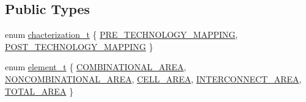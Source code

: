 \subsection*{Public Types}
\begin{DoxyCompactItemize}
\item 
enum \hyperlink{classarea__model_a8bb245f91e2af8874434d985e96a64a2}{chacterization\+\_\+t} \{ \hyperlink{classarea__model_a8bb245f91e2af8874434d985e96a64a2a9e6c444ad927f0509bb963a829231f2c}{P\+R\+E\+\_\+\+T\+E\+C\+H\+N\+O\+L\+O\+G\+Y\+\_\+\+M\+A\+P\+P\+I\+NG}, 
\hyperlink{classarea__model_a8bb245f91e2af8874434d985e96a64a2af80d725dcb73222e795156892d49b646}{P\+O\+S\+T\+\_\+\+T\+E\+C\+H\+N\+O\+L\+O\+G\+Y\+\_\+\+M\+A\+P\+P\+I\+NG}
 \}
\item 
enum \hyperlink{classarea__model_ac1fe30caa84927ad582e392cc6821951}{element\+\_\+t} \{ \newline
\hyperlink{classarea__model_ac1fe30caa84927ad582e392cc6821951ad0ebf06d6b78fbefcb0e5c50d7d0dc99}{C\+O\+M\+B\+I\+N\+A\+T\+I\+O\+N\+A\+L\+\_\+\+A\+R\+EA}, 
\hyperlink{classarea__model_ac1fe30caa84927ad582e392cc6821951af4189fdcd8d0b8f772317c1e40ba8b38}{N\+O\+N\+C\+O\+M\+B\+I\+N\+A\+T\+I\+O\+N\+A\+L\+\_\+\+A\+R\+EA}, 
\hyperlink{classarea__model_ac1fe30caa84927ad582e392cc6821951ace89585784f8d954c82f911699e50a5d}{C\+E\+L\+L\+\_\+\+A\+R\+EA}, 
\hyperlink{classarea__model_ac1fe30caa84927ad582e392cc6821951a6f7f2b63cd258c49d6423f77daee4437}{I\+N\+T\+E\+R\+C\+O\+N\+N\+E\+C\+T\+\_\+\+A\+R\+EA}, 
\newline
\hyperlink{classarea__model_ac1fe30caa84927ad582e392cc6821951a25d20f939a45888e81197ff61eeaeb34}{T\+O\+T\+A\+L\+\_\+\+A\+R\+EA}
 \}
\end{DoxyCompactItemize}
